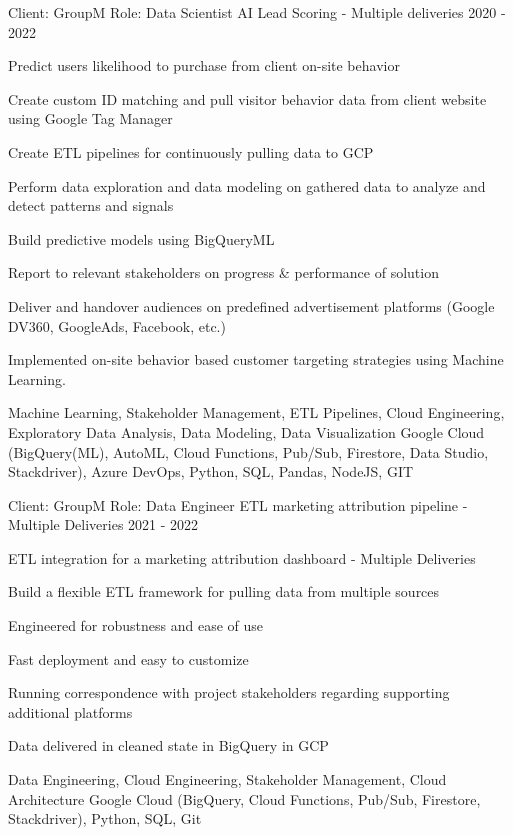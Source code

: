 \begin{cventries}
\cventry
{Client: GroupM \newline Role: Data Scientist} %
{AI Lead Scoring - Multiple deliveries} %
{}%
{2020 - 2022} %
{ %
\begin{cvitems}
\item {Predict users likelihood to purchase from client on-site behavior}
\item {Create custom ID matching and pull visitor behavior data from client website using Google Tag Manager }
\item {Create ETL pipelines for continuously pulling data to GCP}
\item {Perform data exploration and data modeling on gathered data to analyze and detect patterns and signals}
\item {Build predictive models using BigQueryML}
\item {Report to relevant stakeholders on progress \& performance of solution}
\item {Deliver and handover audiences on predefined advertisement platforms (Google DV360, GoogleAds, Facebook, etc.) }
\item {Implemented on-site behavior based customer targeting strategies using Machine Learning.}
\end{cvitems}
\cventrykeywords
{Machine Learning, Stakeholder Management, ETL Pipelines, Cloud Engineering,  Exploratory Data Analysis, Data Modeling, Data Visualization}
{Google Cloud (BigQuery(ML), AutoML, Cloud Functions, Pub/Sub, Firestore, Data Studio, Stackdriver), Azure DevOps, Python, SQL, Pandas, NodeJS, GIT}
}

\cventry
{Client: GroupM \newline Role: Data Engineer} %
{ETL marketing attribution pipeline - Multiple Deliveries} %
{}%
{2021 - 2022} %
{ %
\begin{cvitems}
    \item {ETL integration for a marketing attribution dashboard - Multiple Deliveries}
    \item {Build a flexible ETL framework for pulling data from multiple sources}
    \item {Engineered for robustness and ease of use}
    \item {Fast deployment and easy to customize}
    \item {Running correspondence with project stakeholders regarding supporting additional platforms}
    \item {Data delivered in cleaned state in BigQuery in GCP }
\end{cvitems}
\cventrykeywords
{Data Engineering, Cloud Engineering, Stakeholder Management, Cloud Architecture}
{Google Cloud (BigQuery, Cloud Functions, Pub/Sub, Firestore, Stackdriver), Python, SQL, Git}
}


\end{cventries}
